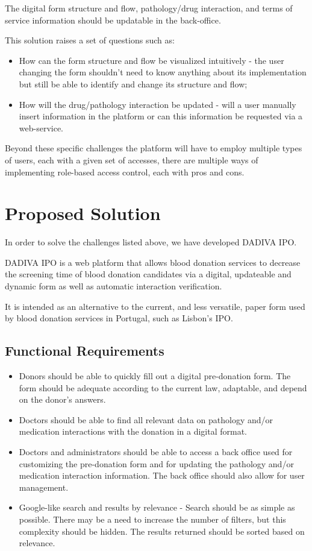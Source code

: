The digital form structure and flow, pathology/drug interaction, and terms of service information should be updatable in the back-office. 

This solution raises a set of questions such as:
\begin{itemize}
	\item How can the form structure and flow be visualized intuitively - the user changing the form shouldn’t need to know anything about its implementation but still be able to identify and change its structure and flow;
	\item How will the drug/pathology interaction be updated - will a user manually insert information in the platform or can this information be requested via a web-service. 
\end{itemize}

Beyond these specific challenges the platform will have to employ multiple types of users, each with a given set of accesses, there are multiple ways of implementing role-based access control, each with pros and cons.

\section{Proposed Solution}

In order to solve the challenges listed above, we have developed DADIVA IPO.

DADIVA IPO is a web platform that allows blood donation services to decrease the screening time of blood donation candidates via a digital, updateable and dynamic form as well as automatic interaction verification.

It is intended as an alternative to the current, and less versatile, paper form used by blood donation services in Portugal, such as Lisbon's IPO.

\subsection{Functional Requirements}
\begin{itemize}
	\item Donors should be able to quickly fill out a digital pre-donation form. The form should be adequate according to the current law, adaptable, and depend on the donor’s answers.
	
	\item Doctors should be able to find all relevant data on pathology and/or medication interactions with the donation in a digital format.
	
	\item Doctors and administrators should be able to access a back office used for customizing the pre-donation form and for updating the pathology and/or medication interaction information. The back office should also allow for user management.
	
	\item Google-like search and results by relevance - Search should be as simple as possible. There may be a need to increase the number of filters, but this complexity should be hidden. The results returned should be sorted based on relevance.
\end{itemize}

